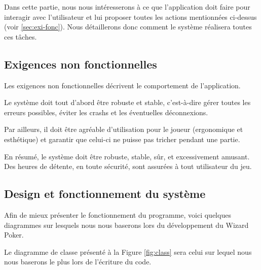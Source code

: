 \documentclass[11pt,a4paper]{article}
\begin{document}
Dans cette partie, nous nous intéresserons à ce que l'application doit
faire pour interagir avec l'utilisateur et lui proposer toutes les
actions mentionnées ci-dessus (voir \ref{sec:exi-fonc}). Nous détaillerons
donc comment le système réalisera toutes ces tâches.


\subsection{Exigences non fonctionnelles}
\label{sec:exi-nonfonc-sys}

Les exigences non fonctionnelles décrivent le comportement de
l'application.

\medbreak

Le système doit tout d'abord être robuste et stable, c'est-à-dire
gérer toutes les erreurs possibles, éviter les crashs et les éventuelles
déconnexions.

\medbreak

Par ailleurs, il doit être agréable d'utilisation pour le joueur
(ergonomique et esthétique) et garantir que celui-ci ne puisse
pas tricher pendant une partie.

\medbreak

En résumé, le système doit être robuste, stable, sûr, et excessivement amusant. Des
heures de détente, en toute sécurité, sont assurées à tout utilisateur du jeu.

\subsection{Design et fonctionnement du système}
\label{sec:design}

Afin de mieux présenter le fonctionnement du programme, voici quelques
diagrammes sur lesquels nous nous baserons lors du
développement du Wizard Poker.

\medbreak

Le diagramme de classe présenté à la Figure \ref{fig:class} sera celui sur lequel nous nous baserons le plus lors de l'écriture du code.
\end{document}
